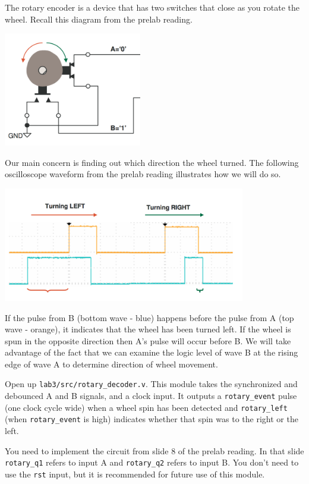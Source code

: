 \documentclass[11pt]{article}
\begin{document}
The rotary encoder is a device that has two switches that close as you rotate the wheel. Recall this diagram from the prelab reading.

\begin{center}
\includegraphics[height=5cm]{images/lab2_fig5.png}
\end{center}

Our main concern is finding out which direction the wheel turned. The following oscilloscope waveform from the prelab reading illustrates how we will do so. 

\begin{center}
	\includegraphics[height=5cm]{images/lab2_fig6.png}
\end{center}

If the pulse from B (bottom wave - blue) happens before the pulse from A (top wave - orange), it indicates that the wheel has been turned left. If the wheel is spun in the opposite direction then A's pulse will occur before B. We will take advantage of the fact that we can examine the logic level of wave B at the rising edge of wave A to determine direction of wheel movement.

Open up \verb|lab3/src/rotary_decoder.v|. This module takes the synchronized and debounced A and B signals, and a clock input. It outputs a \verb|rotary_event| pulse (one clock cycle wide) when a wheel spin has been detected and \verb|rotary_left| (when \verb|rotary_event| is high) indicates whether that spin was to the right or the left.

You need to implement the circuit from slide 8 of the prelab reading. In that slide \verb|rotary_q1| refers to input A and \verb|rotary_q2| refers to input B. You don't need to use the \verb|rst| input, but it is recommended for future use of this module.
\end{document}
